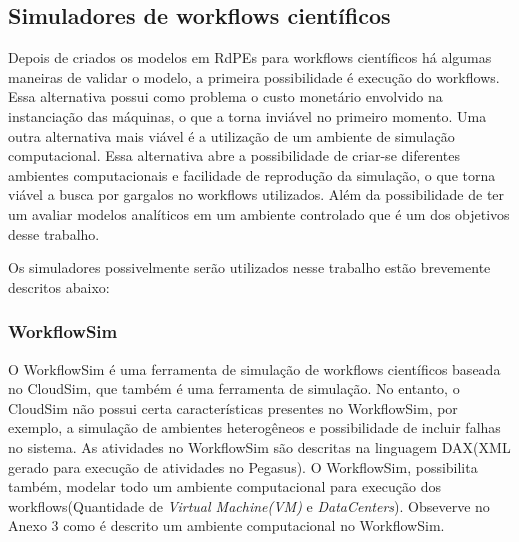 

	\subsection{Simuladores de workflows científicos}	
			
	Depois de criados os modelos em RdPEs para workflows científicos há algumas maneiras de validar o modelo, a primeira possibilidade é execução do workflows. Essa alternativa possui como problema o custo monetário envolvido na instanciação das máquinas, o que a torna inviável no primeiro momento. Uma outra alternativa mais viável é a  utilização de um ambiente de simulação computacional. Essa alternativa abre a possibilidade de criar-se diferentes ambientes computacionais e facilidade de reprodução da simulação, o que torna viável a busca por gargalos no workflows utilizados. Além da possibilidade de ter um avaliar modelos analíticos em um ambiente controlado que é um dos objetivos desse trabalho. 
	
	Os simuladores possivelmente serão utilizados nesse trabalho estão brevemente descritos abaixo:
			\subsubsection{WorkflowSim}
	O WorkflowSim\cite{chen:workflowsim} é uma ferramenta de simulação de workflows científicos baseada no CloudSim\cite{google:cloudsim}, que também é uma ferramenta de simulação. No entanto, o CloudSim não possui certa características presentes no WorkflowSim, por exemplo, a simulação de ambientes heterogêneos e possibilidade de incluir falhas no sistema. As atividades no WorkflowSim  são descritas na linguagem DAX(XML gerado para execução de atividades no Pegasus). O WorkflowSim, possibilita também, modelar todo um ambiente computacional para execução dos workflows(Quantidade de \textit{Virtual Machine(VM)} e \textit{DataCenters}). Obseverve no Anexo 3 como é descrito um ambiente computacional no WorkflowSim. 
							
				

